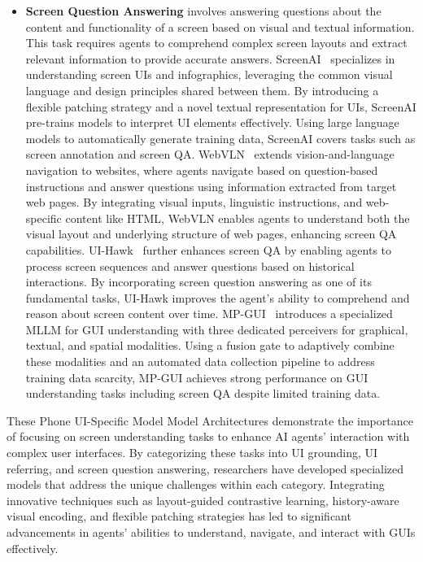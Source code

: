 \begin{itemize}
\item \textbf{Screen Question Answering}
involves answering questions about the content and functionality of a screen based on visual and textual information. This task requires agents to comprehend complex screen layouts and extract relevant information to provide accurate answers.
ScreenAI~\cite{baechler2024screenai} specializes in understanding screen UIs and infographics, leveraging the common visual language and design principles shared between them. By introducing a flexible patching strategy and a novel textual representation for UIs, ScreenAI pre-trains models to interpret UI elements effectively. Using large language models to automatically generate training data, ScreenAI covers tasks such as screen annotation and screen QA.
WebVLN~\cite{chen2024webvln} extends vision-and-language navigation to websites, where agents navigate based on question-based instructions and answer questions using information extracted from target web pages. By integrating visual inputs, linguistic instructions, and web-specific content like HTML, WebVLN enables agents to understand both the visual layout and underlying structure of web pages, enhancing screen QA capabilities.
UI-Hawk~\cite{zhang2024ui-hawk} further enhances screen QA by enabling agents to process screen sequences and answer questions based on historical interactions. By incorporating screen question answering as one of its fundamental tasks, UI-Hawk improves the agent's ability to comprehend and reason about screen content over time.
MP-GUI~\cite{wang2025mp} introduces a specialized MLLM for GUI understanding with three dedicated perceivers for graphical, textual, and spatial modalities. Using a fusion gate to adaptively combine these modalities and an automated data collection pipeline to address training data scarcity, MP-GUI achieves strong performance on GUI understanding tasks including screen QA despite limited training data.
\end{itemize} 


These Phone UI-Specific Model Model Architectures demonstrate the importance of focusing on screen understanding tasks to enhance AI agents' interaction with complex user interfaces. By categorizing these tasks into UI grounding, UI referring, and screen question answering, researchers have developed specialized models that address the unique challenges within each category. Integrating innovative techniques such as layout-guided contrastive learning, history-aware visual encoding, and flexible patching strategies has led to significant advancements in agents' abilities to understand, navigate, and interact with GUIs effectively.

